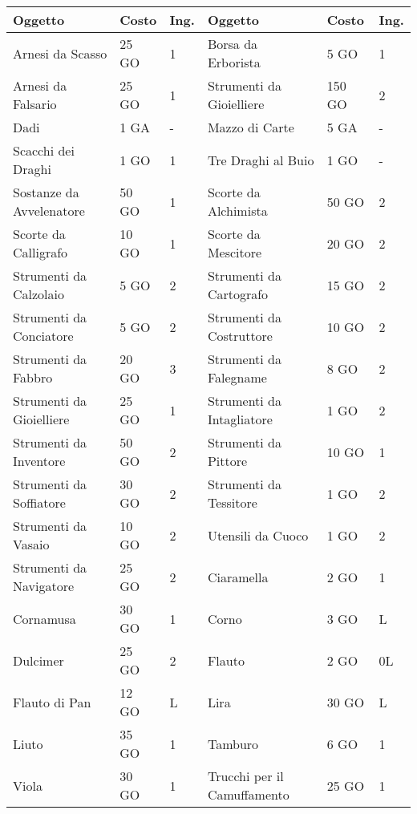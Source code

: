 \documentclass[12pt,a4paper,twoside,openany]{book}
\begin{document}
\medskip

\begin{tabularx}{0.95\textwidth}{llX|llX}
\textbf{Oggetto}&\textbf{Costo}&\textbf{Ing.}&\textbf{Oggetto}&\textbf{Costo}&\textbf{Ing.}\\
\toprule
Arnesi da Scasso&25 GO&1&Borsa da Erborista&5 GO&1\\
Arnesi da Falsario&25 GO&1&Strumenti da Gioielliere&150 GO&2\\
Dadi&1 GA&-&Mazzo di Carte&5 GA&-\\
Scacchi dei Draghi&1 GO&1&Tre Draghi al Buio&1 GO&-\\
Sostanze da Avvelenatore&50 GO&1&Scorte da Alchimista&50 GO&2\\
Scorte da Calligrafo&10 GO&1&Scorte da Mescitore&20 GO&2\\
Strumenti da Calzolaio&5 GO&2&Strumenti da Cartografo&15 GO&2\\
Strumenti da Conciatore&5 GO&2&Strumenti da Costruttore&10 GO&2\\
Strumenti da Fabbro&20 GO&3&Strumenti da Falegname&8 GO&2\\
Strumenti da Gioielliere&25 GO&1&Strumenti da Intagliatore&1 GO&2\\
Strumenti da Inventore&50 GO&2&Strumenti da Pittore&10 GO&1\\
Strumenti da Soffiatore&30 GO&2&Strumenti da Tessitore&1 GO&2\\
Strumenti da Vasaio&10 GO&2&Utensili da Cuoco&1 GO&2\\
Strumenti da Navigatore&25 GO&2&Ciaramella&2 GO&1\\
Cornamusa&30 GO&1&Corno&3 GO&L\\
Dulcimer&25 GO&2&Flauto&2 GO&0L\\
Flauto di Pan&12 GO&L&Lira&30 GO&L\\
Liuto&35 GO&1&Tamburo&6 GO&1\\
Viola&30 GO&1&Trucchi per il Camuffamento&25 GO&1\\
\end{tabularx}
\end{document}
